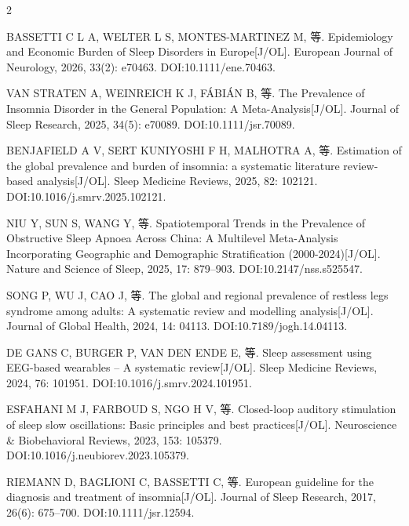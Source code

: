\documentclass[UTF8,zihao=5,fontset=none]{ctexart}
\newcommand{\song}{\CJKfamily{song}}
\newcommand{\hei}{\CJKfamily{hei}}
\begin{document}
\begin{multicols}{2}
\vspace{15.6pt}\noindent{\hei\fontsize{12pt}{14.4pt}\selectfont\bfseries 参考文献}\par\vspace{8pt}
{\song\fontsize{7.5pt}{9pt}\selectfont\setlength{\parindent}{0pt}\setlength{\parskip}{0pt}%
\sloppy
{}
\makebox[25.2pt][l]{[1]}BASSETTI C L A, WELTER L S, MONTES-MARTINEZ M, 等. Epidemiology and Economic Burden of Sleep Disorders in Europe[J/OL]. European Journal of Neurology, 2026, 33(2): e70463. DOI:10.1111/ene.70463.\par
\makebox[25.2pt][l]{[2]}VAN STRATEN A, WEINREICH K J, FÁBIÁN B, 等. The Prevalence of Insomnia Disorder in the General Population: A Meta-Analysis[J/OL]. Journal of Sleep Research, 2025, 34(5): e70089. DOI:10.1111/jsr.70089.\par
\makebox[25.2pt][l]{[3]}BENJAFIELD A V, SERT KUNIYOSHI F H, MALHOTRA A, 等. Estimation of the global prevalence and burden of insomnia: a systematic literature review-based analysis[J/OL]. Sleep Medicine Reviews, 2025, 82: 102121. DOI:10.1016/j.smrv.2025.102121.\par
\makebox[25.2pt][l]{[4]}NIU Y, SUN S, WANG Y, 等. Spatiotemporal Trends in the Prevalence of Obstructive Sleep Apnoea Across China: A Multilevel Meta-Analysis Incorporating Geographic and Demographic Stratification (2000-2024)[J/OL]. Nature and Science of Sleep, 2025, 17: 879--903. DOI:10.2147/nss.s525547.\par
\makebox[25.2pt][l]{[5]}SONG P, WU J, CAO J, 等. The global and regional prevalence of restless legs syndrome among adults: A systematic review and modelling analysis[J/OL]. Journal of Global Health, 2024, 14: 04113. DOI:10.7189/jogh.14.04113.\par
\makebox[25.2pt][l]{[6]}DE GANS C, BURGER P, VAN DEN ENDE E, 等. Sleep assessment using EEG-based wearables – A systematic review[J/OL]. Sleep Medicine Reviews, 2024, 76: 101951. DOI:10.1016/j.smrv.2024.101951.\par
\makebox[25.2pt][l]{[7]}ESFAHANI M J, FARBOUD S, NGO H V, 等. Closed-loop auditory stimulation of sleep slow oscillations: Basic principles and best practices[J/OL]. Neuroscience \& Biobehavioral Reviews, 2023, 153: 105379. DOI:10.1016/j.neubiorev.2023.105379.\par
\makebox[25.2pt][l]{[8]}RIEMANN D, BAGLIONI C, BASSETTI C, 等. European guideline for the diagnosis and treatment of insomnia[J/OL]. Journal of Sleep Research, 2017, 26(6): 675--700. DOI:10.1111/jsr.12594.\par
}
\end{multicols}
\end{document}
